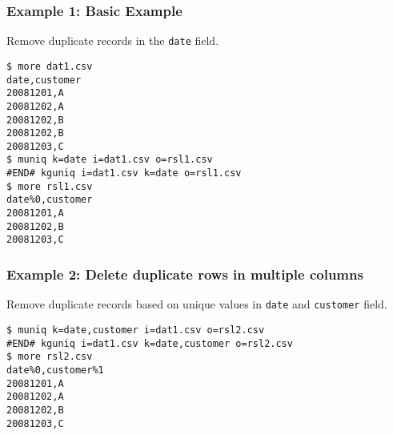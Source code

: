\subsubsection*{Example 1: Basic Example}

Remove duplicate records in the \verb|date| field.


\begin{Verbatim}[baselinestretch=0.7,frame=single]
$ more dat1.csv
date,customer
20081201,A
20081202,A
20081202,B
20081202,B
20081203,C
$ muniq k=date i=dat1.csv o=rsl1.csv
#END# kguniq i=dat1.csv k=date o=rsl1.csv
$ more rsl1.csv
date%0,customer
20081201,A
20081202,B
20081203,C
\end{Verbatim}
\subsubsection*{Example 2: Delete duplicate rows in multiple columns}

Remove duplicate records based on unique values in \verb|date| and \verb|customer| field.


\begin{Verbatim}[baselinestretch=0.7,frame=single]
$ muniq k=date,customer i=dat1.csv o=rsl2.csv
#END# kguniq i=dat1.csv k=date,customer o=rsl2.csv
$ more rsl2.csv
date%0,customer%1
20081201,A
20081202,A
20081202,B
20081203,C
\end{Verbatim}
